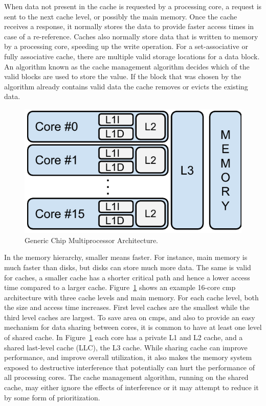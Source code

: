 When data not present in the cache is requested by a processing core, a request is sent to the next cache level, or possibly the main memory.
Once the cache receives a response, it normally stores the data to provide faster access times in case of a re-reference.
Caches also normally store data that is written to memory by a processing core, speeding up the write operation.
For a set-associative or fully associative cache, there are multiple valid storage locations for a data block.
An algorithm known as the cache management algorithm decides which of the valid blocks are used to store the value.
If the block that was chosen by the algorithm already contains valid data the cache removes or evicts the existing data.

\begin{figure}[th]
\centering
\includegraphics[scale=.65]{figures/processor_model/processor_model}
\caption{Generic Chip Multiprocessor Architecture.}
\label{fig:cmp_model}
\end{figure}

In the memory hierarchy, smaller means faster. 
For instance, main memory is much faster than disks, but disks can store much more data.
The same is valid for caches, a smaller cache has a shorter critical path and hence a lower access time compared to a larger cache.
Figure~\ref{fig:cmp_model} shows an example 16-core \gls{cmp} architecture with three cache levels and main memory.
For each cache level, both the size and access time increases.
First level caches are the smallest while the third level caches are largest.
To save area on \glspl{cmp}, and also to provide an easy mechanism for data sharing between cores, it is common to have at least one level of shared cache.
In Figure~\ref{fig:cmp_model} each core has a private L1 and L2 cache, and a shared last-level cache (LLC), the L3 cache.
While sharing cache can improve performance, and improve overall utilization, it also makes the memory system exposed to destructive interference that potentially can hurt the performance of all processing cores. 
The cache management algorithm, running on the shared cache, may either ignore the effects of interference or it may attempt to reduce it by some form of prioritization.

